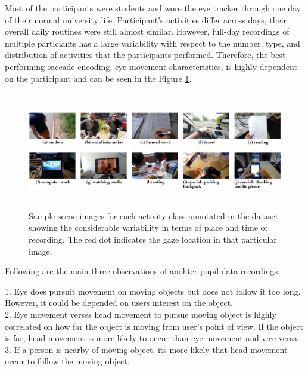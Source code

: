 Most of the participants were students and wore the eye tracker through one day of their normal university life. Participant's activities differ across days, their overall daily routines were still almost similar. However, full-day recordings of multiple particiants has a large variability with respect to the number, type, and distribution of activities that the participants performed. Therefore, the best performing saccade encoding, eye movement characteristics, is highly dependent on the participant and can be seen in the Figure \ref{obs3}.\\ 

\begin{figure}[!hbt]
  \centering
  \includegraphics[width=5in,height=2in]{obs3.png}
  \caption{Sample scene images for each activity class annotated in the dataset showing the considerable variability in terms of place and time of recording. The red dot indicates the gaze location in that particular image.}
  \label{obs3}
\end{figure}

Following are the main three observations of anohter pupil data recordings:

1. Eye does pursuit movement on moving objects but does not follow it too long. However, it could be depended on users interest on the object.\\

2. Eye movement verses head movement to pursue moving object is highly correlated on how far the object is moving from user's point of view. If the object is far, head movement is more likely to occur than eye movement and vice versa.\\

3. If a person is nearby of moving object, its more likely that head movement occur to follow the moving object.\\




%   

